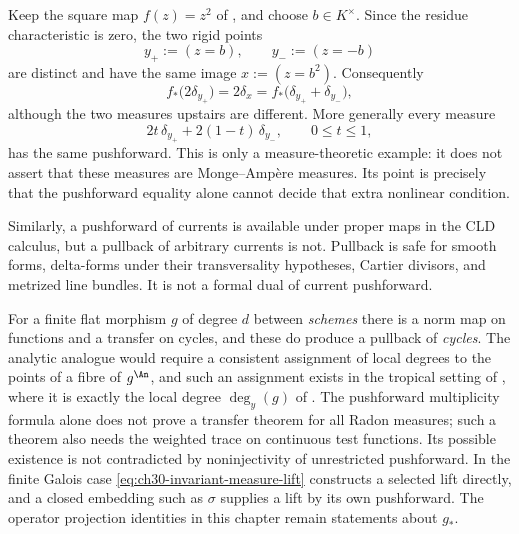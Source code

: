 \begin{example}
\label{ex:ch30-two-measures}
Keep the square map $f(z)=z^2$ of , and choose
$b\in K^\times$.  Since the residue characteristic is zero, the two rigid
points
\[
                    y_+:=(z=b),\qquad y_-:=(z=-b)
\]
are distinct and have the same image $x:=(z=b^2)$.  Consequently
\[
 f_*\bigl(2\delta_{y_+}\bigr)
   =2\delta_x
   =f_*\bigl(\delta_{y_+}+\delta_{y_-}\bigr),
\]
although the two measures upstairs are different.  More generally every
measure
\[
              2t\,\delta_{y_+}+2(1-t)\,\delta_{y_-},
              \qquad 0\leq t\leq1,
\]
has the same pushforward.  This is only a measure-theoretic example: it
does not assert that these measures are Monge--Amp\`ere measures.  Its point
is precisely that the pushforward equality alone cannot decide that extra
nonlinear condition.
\end{example}

Similarly, a pushforward of currents is available under proper maps in the
CLD calculus, but a pullback of arbitrary currents is not.  Pullback is safe
for smooth forms, delta-forms under their transversality hypotheses, Cartier
divisors, and metrized line bundles.  It is not a formal dual of current
pushforward.

\begin{remark}
\label{rem:ch30-measure-pullback}
For a finite flat morphism $g$ of degree $d$ between \emph{schemes}
there is a norm map on functions and a transfer on cycles, and these do
produce a pullback of \emph{cycles}.  The analytic analogue would require a
consistent assignment of local degrees to the points of a fibre of
$g^{\An}$, and such an assignment exists in the tropical setting of
, where it is exactly the local degree
$\deg_y(g)$ of .  The pushforward multiplicity formula alone does not prove a transfer
theorem for all Radon measures; such a theorem also needs the weighted
trace on continuous test functions.  Its possible existence is not
contradicted by noninjectivity of unrestricted pushforward.
In the finite Galois case
\eqref{eq:ch30-invariant-measure-lift} constructs a selected lift
directly, and a closed embedding such as $\sigma$ supplies a lift by
its own pushforward.  The operator projection identities in this
chapter remain statements about $g_*$.
\end{remark}

